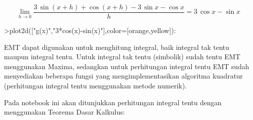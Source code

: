 \documentclass{article}
\begin{document}
\begin{eulernotebook}
\begin{eulercomment}
\begin{eulercomment}
\begin{euleroutput}
\end{euleroutput}
\begin{eulerformula}
\[
\lim_{h\rightarrow 0}{\frac{3\,\sin \left(x+h\right)+\cos \left(x+h  \right)-3\,\sin x-\cos x}{h}}=3\,\cos x-\sin x
\]
\end{eulerformula}
\begin{eulerprompt}
>plot2d(["g(x)","3*cos(x)-sin(x)"],color=[orange,yellow]):
\end{eulerprompt}
\begin{eulercomment}
EMT dapat digunakan untuk menghitung integral, baik integral tak tentu
maupun integral tentu. Untuk integral tak tentu (simbolik) sudah tentu
EMT menggunakan Maxima, sedangkan untuk perhitungan integral tentu EMT
sudah menyediakan beberapa fungsi yang mengimplementasikan algoritma
kuadratur (perhitungan integral tentu menggunakan metode numerik).

Pada notebook ini akan ditunjukkan perhitungan integral tentu dengan
menggunakan Teorema Dasar Kalkulus:


\end{eulercomment}
\end{eulercomment}
\end{eulercomment}
\end{eulernotebook}
\end{document}
